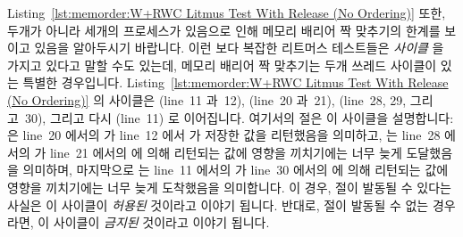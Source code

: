 Listing~\ref{lst:memorder:W+RWC Litmus Test With Release (No Ordering)}
또한, 두개가 아니라 세개의 프로세스가 있음으로 인해 메모리 배리어 짝 맞추기의
한계를 보이고 있음을 알아두시기 바랍니다.
이런 보다 복잡한 리트머스 테스트들은 \emph{사이클} 을 가지고 있다고 말할 수도
있는데, 메모리 배리어 짝 맞추기는 두개 쓰레드 사이클이 있는 특별한 경우입니다.
Listing~\ref{lst:memorder:W+RWC Litmus Test With Release (No Ordering)}
의 사이클은  (line~11 과~12),  (line~20 과~21), 
(line~28, 29, 그리고~30), 그리고 다시  (line~11) 로 이어집니다.
여기서의  절은 이 사이클을 설명합니다:
 은 line~20 에서의  가 line~12 에서
 가 저장한 값을 리턴했음을 의미하고,  는
line~28 에서의  가 line~21 에서의  에 의해
리턴되는 값에 영향을 끼치기에는 너무 늦게 도달했음을 의미하며, 마지막으로
 는 line~11 에서의  가 line~30 에서의
 에 의해 리턴되는 값에 영향을 끼치기에는 너무 늦게 도착했음을
의미합니다.
이 경우,  절이 발동될 수 있다는 사실은 이 사이클이 \emph{허용된}
것이라고 이야기 됩니다.
반대로,  절이 발동될 수 없는 경우라면, 이 사이클이 \emph{금지된}
것이라고 이야기 됩니다.

